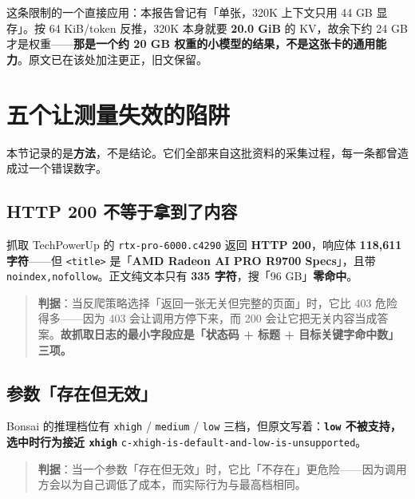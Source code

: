 这条限制的一个直接应用：本报告曾记有「单张，320K 上下文只用 44 GB 显存」。按 64 KiB/token 反推，320K 本身就要 \textbf{20.0 GiB} 的 KV，故余下约 24 GB 才是权重——\textbf{那是一个约 20 GB 权重的小模型的结果，不是这张卡的通用能力}。原文已在该处加注更正，旧文保留。



\section{五个让测量失效的陷阱}

本节记录的是\textbf{方法}，不是结论。它们全部来自这批资料的采集过程，每一条都曾造成过一个错误数字。


\subsection{HTTP 200 不等于拿到了内容}

抓取 TechPowerUp 的 \texttt{rtx-pro-6000.c4290} 返回 \textbf{HTTP 200}，响应体 \textbf{118,611 字符}——但 \texttt{<title>} 是「\textbf{AMD Radeon AI PRO R9700 Specs}」，且带 \texttt{noindex,nofollow}。正文纯文本只有 \textbf{335 字符}，搜「96 GB」\textbf{零命中}。


\begin{quote}\small
\textbf{判据}：当反爬策略选择「返回一张无关但完整的页面」时，它比 403 危险得多——因为 403 会让调用方停下来，而 200 会让它把无关内容当成答案。\textbf{故抓取日志的最小字段应是「状态码 + 标题 + 目标关键字命中数」三项。}

\end{quote}

\subsection{参数「存在但无效」}

Bonsai 的推理档位有 \texttt{xhigh} / \texttt{medium} / \texttt{low} 三档，但原文写着：\textbf{\texttt{low} 不被支持，选中时行为接近 \texttt{xhigh}} {\scriptsize\texttt{c-\hspace{0pt}xhigh-\hspace{0pt}is-\hspace{0pt}default-\hspace{0pt}and-\hspace{0pt}low-\hspace{0pt}is-\hspace{0pt}unsupported}}。


\begin{quote}\small
\textbf{判据}：当一个参数「存在但无效」时，它比「不存在」更危险——因为调用方会以为自己调低了成本，而实际行为与最高档相同。

\end{quote}

